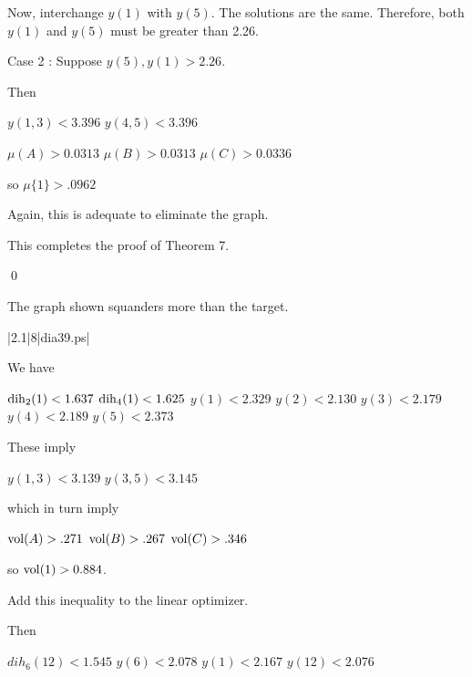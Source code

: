 Now, interchange $y(1)$ with $y(5)$.  The solutions are the same.
Therefore, both $y(1)$ and $y(5)$ must be greater than 2.26.



Case 2 : Suppose $y(5),y(1)>2.26.$


Then

$y(1,3)<3.396$ \newline
$y(4,5)<3.396$ \newline

$\mu(A)>0.0313$ \newline
$\mu(B)>0.0313$ \newline
$\mu(C)>0.0336$ \newline

so $\mu\{1\}>.0962$

Again, this is adequate to eliminate the graph.

This completes the proof of Theorem 7.

\qed


\bigskip



 The graph shown 
squanders more than the target.  \endproclaim

\gram|2.1|8|dia39.ps|  %

We have 

$\operatorname{dih}_2(1) < 1.637$ \newline
$\operatorname{dih}_4(1) < 1.625$ \newline
$y(1)<2.329$ \newline
$y(2)<2.130$ \newline
$y(3)<2.179$ \newline
$y(4)<2.189$ \newline
$y(5)<2.373$ \newline

These imply 

$y(1,3)<3.139$ \newline
$y(3,5)<3.145$ \newline

which in turn imply

$\operatorname{vol}(A)>.271$ \newline
$\operatorname{vol}(B)>.267$ \newline
$\operatorname{vol}(C)>.346$ \newline

so $\operatorname{vol}(1)>0.884$.

Add this inequality to the linear optimizer.

Then

$dih_6(12)<1.545$ \newline
$y(6)<2.078$ \newline
$y(1)<2.167$ \newline
$y(12)<2.076$ \newline

